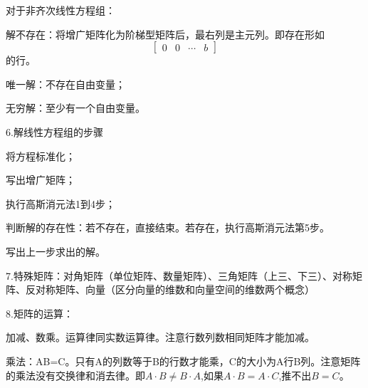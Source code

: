\documentclass{article}
\begin{document}
对于非齐次线性方程组：
\begin{asparaenum}[(1)]
\item 解不存在：将增广矩阵化为阶梯型矩阵后，最右列是主元列。即存在形如
    \begin{equation*}
      \begin{bmatrix}
        0& 0& \cdots&b
      \end{bmatrix}
    \end{equation*}
的行。
\item 唯一解：不存在自由变量；

\item 无穷解：至少有一个自由变量。
\end{asparaenum}

6.\textcolor[rgb]{1.00,0.00,0.00}{解线性方程组的步骤}
\begin{asparaenum}[(1)]
\item 将方程标准化；
\item 写出增广矩阵；
\item 执行高斯消元法1到4步；
\item 判断解的存在性：若不存在，直接结束。若存在，执行高斯消元法第5步。
\item  写出上一步求出的解。
\end{asparaenum}

7.特殊矩阵：对角矩阵（\textcolor[rgb]{1.00,0.00,0.00}{单位矩阵}、数量矩阵）、三角矩阵（上三、下三）、对称矩阵、反对称矩阵、\textcolor[rgb]{1.00,0.00,0.00}{向量}（区分向量的维数和向量空间的维数两个概念）

8.矩阵的运算：
\begin{asparaenum}[(1)]
\item 加减、数乘。运算律同实数运算律。注意行数列数相同矩阵才能加减。
\item 乘法：AB=C。只有A的列数等于B的行数才能乘，C的大小为A行B列。注意矩阵的乘法没有交换律和消去律。即$A\cdot B\neq B \cdot A$,如果$A\cdot B=A\cdot C$,推不出$B=C$。
\end{asparaenum}
\end{document}
